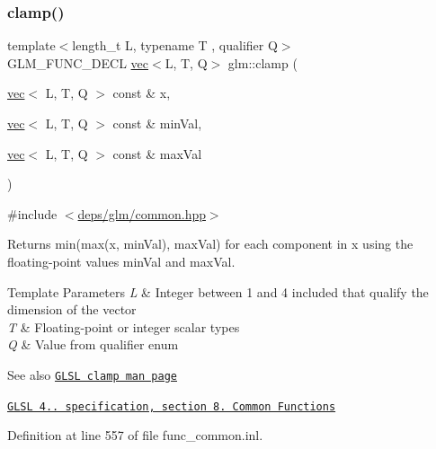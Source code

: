 \mbox{\label{group__core__func__common_ga748333282a6f2f87762c0a4739c8c364}} 
\subsubsection{\texorpdfstring{clamp()}{clamp()}\hspace{0.1cm}{\footnotesize\ttfamily [3/3]}}
{\footnotesize\ttfamily template$<$length\+\_\+t L, typename T , qualifier Q$>$ \\
G\+L\+M\+\_\+\+F\+U\+N\+C\+\_\+\+D\+E\+CL \hyperlink{structglm_1_1vec}{vec}$<$L, T, Q$>$ glm\+::clamp (\begin{DoxyParamCaption}\item[{\hyperlink{structglm_1_1vec}{vec}$<$ L, T, Q $>$ const \&}]{x,  }\item[{\hyperlink{structglm_1_1vec}{vec}$<$ L, T, Q $>$ const \&}]{min\+Val,  }\item[{\hyperlink{structglm_1_1vec}{vec}$<$ L, T, Q $>$ const \&}]{max\+Val }\end{DoxyParamCaption})}



{\ttfamily \#include $<$\hyperlink{common_8hpp}{deps/glm/common.\+hpp}$>$}

Returns min(max(x, min\+Val), max\+Val) for each component in x using the floating-\/point values min\+Val and max\+Val.


\begin{DoxyTemplParams}{Template Parameters}
{\em L} & Integer between 1 and 4 included that qualify the dimension of the vector \\
\hline
{\em T} & Floating-\/point or integer scalar types \\
\hline
{\em Q} & Value from qualifier enum\\
\hline
\end{DoxyTemplParams}
\begin{DoxySeeAlso}{See also}
\href{http://www.opengl.org/sdk/docs/manglsl/xhtml/clamp.xml}{\tt G\+L\+SL clamp man page} 

\href{http://www.opengl.org/registry/doc/GLSLangSpec.4.20.8.pdf}{\tt G\+L\+SL 4.. specification, section 8. Common Functions} 
\end{DoxySeeAlso}


Definition at line 557 of file func\+\_\+common.\+inl.

